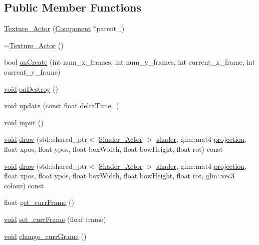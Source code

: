 \subsection*{Public Member Functions}
\begin{DoxyCompactItemize}
\item 
\hyperlink{classTexture__Actor_aa3fa337dfab146ebf9fd1f10fdf156f3}{Texture\+\_\+\+Actor} (\hyperlink{classComponent}{Component} $\ast$parent\+\_\+)
\item 
\hyperlink{classTexture__Actor_ae1426bad44e2d168a5016807acbcbb7e}{$\sim$\+Texture\+\_\+\+Actor} ()
\item 
bool \hyperlink{classTexture__Actor_a7c13a92a6ffe242318a45e3ac4d9a88f}{on\+Create} (int num\+\_\+x\+\_\+frames, int num\+\_\+y\+\_\+frames, int current\+\_\+x\+\_\+frame, int current\+\_\+y\+\_\+frame)
\item 
\hyperlink{imgui__impl__opengl3__loader_8h_ac668e7cffd9e2e9cfee428b9b2f34fa7}{void} \hyperlink{classTexture__Actor_ac9677f60df27e14ef3550ae2b0678ad5}{on\+Destroy} ()
\item 
\hyperlink{imgui__impl__opengl3__loader_8h_ac668e7cffd9e2e9cfee428b9b2f34fa7}{void} \hyperlink{classTexture__Actor_afe03163ea0bff0ea0fa3c3fb6c560c79}{update} (const float delta\+Time\+\_\+)
\item 
\hyperlink{imgui__impl__opengl3__loader_8h_ac668e7cffd9e2e9cfee428b9b2f34fa7}{void} \hyperlink{classTexture__Actor_ae38f4abc7a47da51410d66d10694a154}{input} ()
\item 
\hyperlink{imgui__impl__opengl3__loader_8h_ac668e7cffd9e2e9cfee428b9b2f34fa7}{void} \hyperlink{classTexture__Actor_a56b306a93f7f91e3f8a51284b9077446}{draw} (std\+::shared\+\_\+ptr$<$ \hyperlink{classShader__Actor}{Shader\+\_\+\+Actor} $>$ \hyperlink{imgui__impl__opengl3__loader_8h_a57b2a96adb1d51204909a82d861e395e}{shader}, glm\+::mat4 \hyperlink{main__menu__state_8cpp_a565d92bfbcc4a481d2d35f3850a382f7}{projection}, float xpos, float ypos, float box\+Width, float bow\+Height, float rot) const
\item 
\hyperlink{imgui__impl__opengl3__loader_8h_ac668e7cffd9e2e9cfee428b9b2f34fa7}{void} \hyperlink{classTexture__Actor_aa3cffcf3b8d123731999d986ab20afd1}{draw} (std\+::shared\+\_\+ptr$<$ \hyperlink{classShader__Actor}{Shader\+\_\+\+Actor} $>$ \hyperlink{imgui__impl__opengl3__loader_8h_a57b2a96adb1d51204909a82d861e395e}{shader}, glm\+::mat4 \hyperlink{main__menu__state_8cpp_a565d92bfbcc4a481d2d35f3850a382f7}{projection}, float xpos, float ypos, float box\+Width, float bow\+Height, float rot, glm\+::vec3 colour) const
\item 
float \hyperlink{classTexture__Actor_a8c5360d7d8edfa2a50832e457509c061}{get\+\_\+curr\+Frame} ()
\item 
\hyperlink{imgui__impl__opengl3__loader_8h_ac668e7cffd9e2e9cfee428b9b2f34fa7}{void} \hyperlink{classTexture__Actor_a1b5d946f426c7d724325021b6336cae7}{set\+\_\+curr\+Frame} (float frame)
\item 
\hyperlink{imgui__impl__opengl3__loader_8h_ac668e7cffd9e2e9cfee428b9b2f34fa7}{void} \hyperlink{classTexture__Actor_a06b9398ac62bf0f55e9090d76a6cb032}{change\+\_\+curr\+Grame} ()
\end{DoxyCompactItemize}
